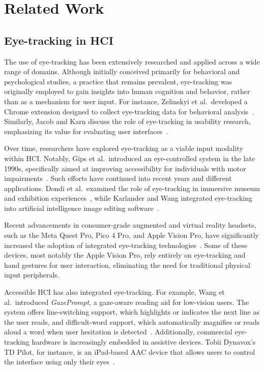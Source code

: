 
\section{Related Work}

\subsection{Eye-tracking in HCI}

The use of eye-tracking has been extensively researched and applied across a wide range of domains. Although initially conceived primarily for behavioral and psychological studies, a practice that remains prevalent, eye-tracking was originally employed to gain insights into human cognition and behavior, rather than as a mechanism for user input. For instance, Zelinskyi et al.\ developed a Chrome extension designed to collect eye-tracking data for behavioral analysis~\cite{zelinskyi2024eyetracking}. Similarly, Jacob and Karn discuss the role of eye-tracking in usability research, emphasizing its value for evaluating user interfaces~\cite{jacob2003commentary}.

Over time, researchers have explored eye-tracking as a viable input modality within HCI. Notably, Gips et al.\ introduced an eye-controlled system in the late 1990s, specifically aimed at improving accessibility for individuals with motor impairments~\cite{gips1996eagleeyes}. Such efforts have continued into recent years and different applications. Dondi et al.\ examined the role of eye-tracking in immersive museum and exhibition experiences~\cite{dondi2023gazehci}, while Karlander and Wang integrated eye-tracking into artificial intelligence image editing software~\cite{karlander2023ai}.

Recent advancements in consumer-grade augmented and virtual reality headsets, such as the Meta Quest Pro, Pico 4 Pro, and Apple Vision Pro, have significantly increased the adoption of integrated eye-tracking technologies~\cite{huang2024visionpro}. Some of these devices, most notably the Apple Vision Pro, rely entirely on eye-tracking and hand gestures for user interaction, eliminating the need for traditional physical input peripherals.

Accessible HCI has also integrated eye-tracking. For example, Wang et al.\ introduced \textit{GazePrompt}, a gaze-aware reading aid for low-vision users. The system offers line-switching support, which highlights or indicates the next line as the user reads, and difficult-word support, which automatically magnifies or reads aloud a word when user hesitation is detected~\cite{wang2024gazeprompt}. Additionally, commercial eye-tracking hardware is increasingly embedded in assistive devices. Tobii Dynavox's TD Pilot, for instance, is an iPad-based \ac{AAC} device that allows users to control the interface using only their eyes~\cite{poster2025td}.

